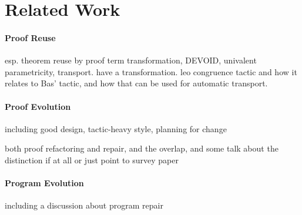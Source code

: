 \section{Related Work}

\paragraph{Proof Reuse}

esp. theorem reuse by proof term transformation, DEVOID, univalent parametricity, transport. \cite{magaud2000changing} have a transformation.
leo congruence tactic and how it relates to Bas' tactic, and how that can be used for automatic transport.

\paragraph{Proof Evolution}

including good design, tactic-heavy style, planning for change

both proof refactoring and repair, and the overlap, and some talk about the distinction if at all or just point to survey paper~\cite{wibergh2019, WhitesidePhD, Dietrich2013, adams2015, Bourke12, Roe2016, robert2018, pumpkinpatch}

\paragraph{Program Evolution}

including a discussion about program repair
